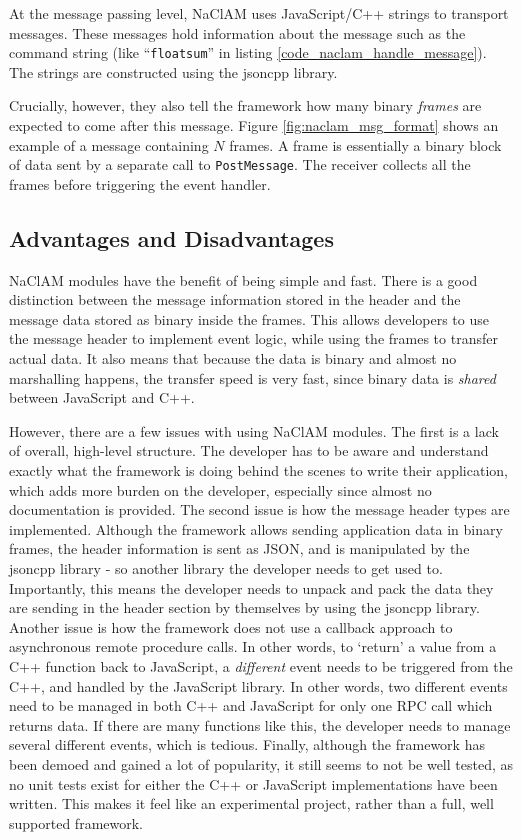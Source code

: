 At the message passing level, NaClAM uses JavaScript/C++ strings to transport messages. These messages hold information about the message such as the command string (like ``\lstinline{floatsum}'' in listing \ref{code_naclam_handle_message}). The strings are constructed using the jsoncpp library. 

Crucially, however, they also tell the framework how many binary \emph{frames} are expected to come after this message. Figure \ref{fig:naclam_msg_format} shows an example of a message containing $N$ frames. A frame is essentially a binary block of data sent by a separate call to \lstinline{PostMessage}. The receiver collects all the frames before triggering the event handler.


\subsection{Advantages and Disadvantages} %
\label{sub:naclam_advantages_and_disadvantages}
NaClAM modules have the benefit of being simple and fast. There is a good distinction between the message information stored in the header and the message data stored as binary inside the frames. This allows developers to use the message header to implement event logic, while using the frames to transfer actual data. It also means that because the data is binary and almost no marshalling happens, the transfer speed is very fast, since binary data is \emph{shared} between JavaScript and C++.

However, there are a few issues with using NaClAM modules. The first is a lack of overall, high-level structure. The developer has to be aware and understand exactly what the framework is doing behind the scenes to write their application, which adds more burden on the developer, especially since almost no documentation is provided. The second issue is how the message header types are implemented. Although the framework allows sending application data in binary frames, the header information is sent as JSON, and is manipulated by the jsoncpp library - so another library the developer needs to get used to. Importantly, this means the developer needs to unpack and pack the data they are sending in the header section by themselves by using the jsoncpp library. Another issue is how the framework does not use a callback approach to asynchronous remote procedure calls. In other words, to `return' a value from a C++ function back to JavaScript, a \emph{different} event needs to be triggered from the C++, and handled by the JavaScript library. In other words, two different events need to be managed in both C++ and JavaScript for only one RPC call which returns data. If there are many functions like this, the developer needs to manage several different events, which is tedious. Finally, although the framework has been demoed and gained a lot of popularity, it still seems to not be well tested, as no unit tests exist for either the C++ or JavaScript implementations have been written. This makes it feel like an experimental project, rather than a full, well supported framework. 

